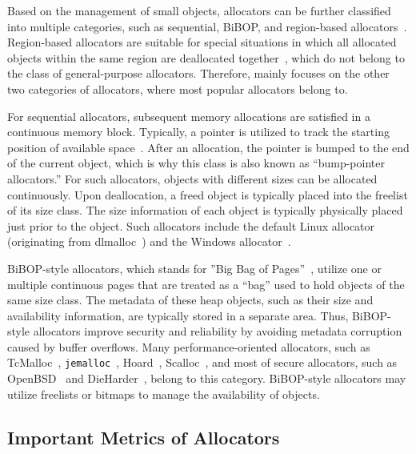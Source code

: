 Based on the management of small objects, allocators can be further classified into multiple categories, such as sequential, BiBOP, and region-based allocators~\cite{DieHarder, Gay:1998:MME:277650.277748}. Region-based allocators are suitable for special situations in which all allocated objects within the same region are deallocated together~\cite{Gay:1998:MME:277650.277748}, which do not belong to the class of general-purpose allocators. Therefore, \MP{} mainly focuses on the other two categories of allocators, where most popular allocators belong to.

For sequential allocators, subsequent memory allocations are satisfied in a continuous memory block. Typically, a pointer is utilized to track the starting position of available space~\cite{Cling}. After an allocation, the pointer is bumped to the end of the current object, which is why this class is also known as ``bump-pointer allocators.'' For such allocators, objects with different sizes can be allocated continuously. Upon deallocation, a freed object is typically placed into the freelist of its size class. The size information of each object is typically physically placed just prior to the object. Such allocators include the default Linux allocator (originating from dlmalloc~\cite{dlmalloc}) and the Windows allocator~\cite{DieHarder}.  

BiBOP-style allocators, which stands for ''Big Bag of Pages''~\cite{hanson1980}, utilize one or multiple continuous pages that are treated as a ``bag'' used to hold objects of the same size class. The metadata of these heap objects, such as their size and availability information, are typically stored in a separate area. Thus, BiBOP-style allocators improve security and reliability by avoiding metadata corruption caused by buffer overflows. Many performance-oriented allocators, such as TcMalloc~\cite{tcmalloc}, \texttt{jemalloc}~\cite{jemalloc}, Hoard~\cite{Hoard}, Scalloc~\cite{Scalloc}, and most of secure allocators, such as OpenBSD~\cite{openbsd} and DieHarder~\cite{DieHarder}, belong to this category. BiBOP-style allocators may utilize freelists or bitmaps to manage the availability of objects. 


\subsection{Important Metrics of Allocators}

